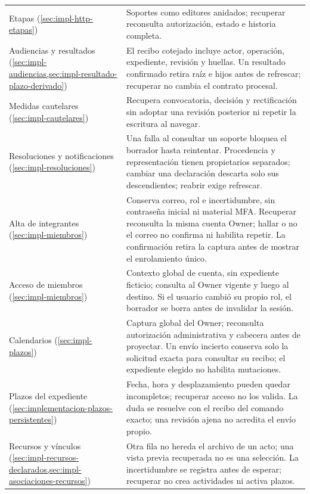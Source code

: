 \begin{longtable}{@{}L{2.9cm}L{\dimexpr\linewidth-2.9cm-2\tabcolsep\relax}@{}}
    Etapas (\cref{sec:impl-http-etapas}) & Soportes como editores anidados; recuperar reconsulta autorización, estado e historia completa. \\
    Audiencias y resultados (\cref{sec:impl-audiencias,sec:impl-resultado-plazo-derivado}) & El recibo cotejado incluye actor, operación, expediente, revisión y huellas. Un resultado confirmado retira raíz e hijos antes de refrescar; recuperar no cambia el contrato procesal. \\
    Medidas cautelares (\cref{sec:impl-cautelares}) & Recupera convocatoria, decisión y rectificación sin adoptar una revisión posterior ni repetir la escritura al navegar. \\
    Resoluciones y notificaciones (\cref{sec:impl-resoluciones}) & Una falla al consultar un soporte bloquea el borrador hasta reintentar. Procedencia y representación tienen propietarios separados; cambiar una declaración descarta solo sus descendientes; reabrir exige refrescar. \\
    Alta de integrantes (\cref{sec:impl-miembros}) & Conserva correo, rol e incertidumbre, sin contraseña inicial ni material MFA. Recuperar reconsulta la misma cuenta Owner; hallar o no el correo no confirma ni habilita repetir. La confirmación retira la captura antes de mostrar el enrolamiento único. \\
    Acceso de miembros (\cref{sec:impl-miembros}) & Contexto global de cuenta, sin expediente ficticio; consulta al Owner vigente y luego al destino. Si el usuario cambió su propio rol, el borrador se borra antes de invalidar la sesión. \\
    Calendarios (\cref{sec:impl-plazos}) & Captura global del Owner; reconsulta autorización administrativa y cabecera antes de proyectar. Un envío incierto conserva solo la solicitud exacta para consultar su recibo; el expediente elegido no habilita mutaciones. \\
    Plazos del expediente (\cref{sec:implementacion-plazos-persistentes}) & Fecha, hora y desplazamiento pueden quedar incompletos; recuperar acceso no los valida. La duda se resuelve con el recibo del comando exacto; una revisión ajena no acredita el envío propio. \\
    Recursos y vínculos (\cref{sec:impl-recursos-declarados,sec:impl-asociaciones-recursos}) & Otra fila no hereda el archivo de un acto; una vista previa recuperada no es una selección. La incertidumbre se registra antes de esperar; recuperar no crea actividades ni activa plazos. \\

\end{longtable}
